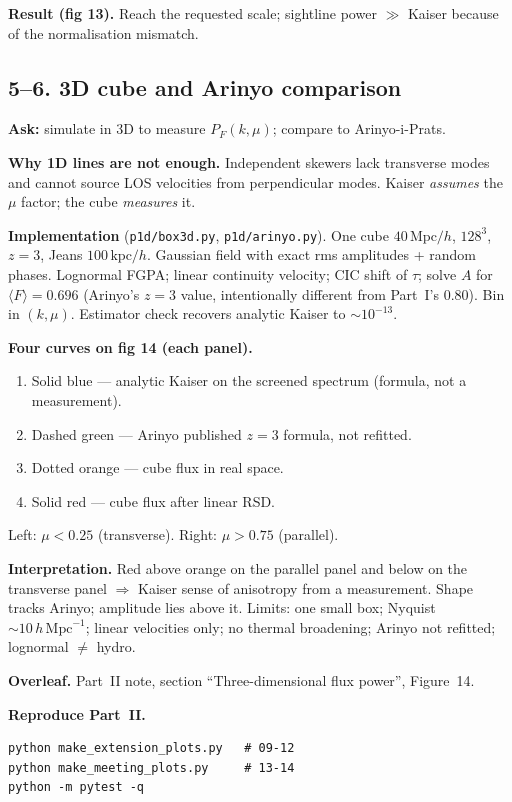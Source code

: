 \documentclass[11pt]{article}
\begin{document}
\textbf{Result (fig 13).}
Reach the requested scale; sightline power $\gg$ Kaiser because of the normalisation mismatch.

\subsection{5--6. 3D cube and Arinyo comparison}

\textbf{Ask:} simulate in 3D to measure $P_F(k,\mu)$; compare to Arinyo-i-Prats.

\textbf{Why 1D lines are not enough.}
Independent skewers lack transverse modes and cannot source LOS velocities from perpendicular modes.
Kaiser \emph{assumes} the $\mu$ factor; the cube \emph{measures} it.

\textbf{Implementation} (\texttt{p1d/box3d.py}, \texttt{p1d/arinyo.py}).
One cube $40\,\mathrm{Mpc}/h$, $128^{3}$, $z=3$, Jeans $100\,\mathrm{kpc}/h$.
Gaussian field with exact rms amplitudes + random phases.
Lognormal FGPA; linear continuity velocity; CIC shift of $\tau$; solve $A$ for $\langle F\rangle=0.696$ (Arinyo's $z=3$ value, intentionally different from Part~I's $0.80$).
Bin in $(k,\mu)$.
Estimator check recovers analytic Kaiser to $\sim 10^{-13}$.

\textbf{Four curves on fig 14 (each panel).}
\begin{enumerate}
\item Solid blue --- analytic Kaiser on the screened spectrum (formula, not a measurement).
\item Dashed green --- Arinyo published $z=3$ formula, not refitted.
\item Dotted orange --- cube flux in real space.
\item Solid red --- cube flux after linear RSD.
\end{enumerate}
Left: $\mu<0.25$ (transverse). Right: $\mu>0.75$ (parallel).

\textbf{Interpretation.}
Red above orange on the parallel panel and below on the transverse panel $\Rightarrow$ Kaiser sense of anisotropy from a measurement.
Shape tracks Arinyo; amplitude lies above it.
Limits: one small box; Nyquist $\sim 10\,h\,\mathrm{Mpc}^{-1}$; linear velocities only; no thermal broadening; Arinyo not refitted; lognormal $\neq$ hydro.

\textbf{Overleaf.}
Part~II note, section ``Three-dimensional flux power'', Figure~14.

\textbf{Reproduce Part~II.}
\begin{verbatim}
python make_extension_plots.py   # 09-12
python make_meeting_plots.py     # 13-14
python -m pytest -q
\end{verbatim}
\end{document}
